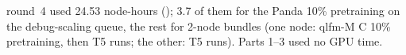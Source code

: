 round~4 used 24.53 node-hours (); 3.7 of them for the Panda 10\% pretraining on the debug-scaling queue, the rest for 2-node bundles (one node: qlfm-M C 10\% pretraining, then T5 runs; the other: T5 runs). Parts 1--3 used no GPU time.
